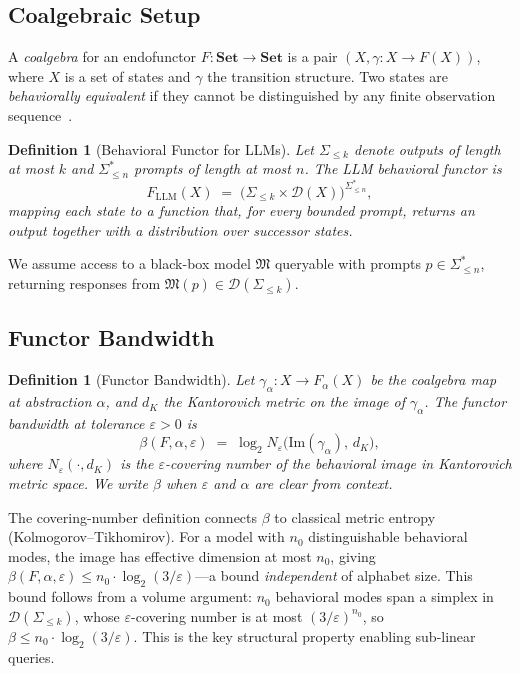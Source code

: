 \documentclass[11pt]{article}
\newtheorem{definition}[theorem]{Definition}
\newcommand{\DD}{\mathcal{D}}
\begin{document}
\subsection{Coalgebraic Setup}

A \emph{coalgebra} for an endofunctor $F: \mathbf{Set} \to
\mathbf{Set}$ is a pair $(X, \gamma: X \to F(X))$, where $X$ is a
set of states and $\gamma$ the transition structure.  Two states are
\emph{behaviorally equivalent} if they cannot be distinguished by any
finite observation sequence~\cite{rutten2000universal}.

\begin{definition}[Behavioral Functor for LLMs]\label{def:functor}
Let $\Sigma_{\le k}$ denote outputs of length at most $k$ and
$\Sigma^*_{\le n}$ prompts of length at most $n$.  The LLM
behavioral functor is
\[
  F_{\mathrm{LLM}}(X) \;=\;
    \bigl(\Sigma_{\le k} \times \DD(X)\bigr)^{\Sigma^*_{\le n}},
\]
mapping each state to a function that, for every bounded prompt,
returns an output together with a distribution over successor states.
\end{definition}

We assume access to a black-box model $\mathfrak{M}$ queryable with
prompts $p \in \Sigma^*_{\le n}$, returning responses from
$\mathfrak{M}(p) \in \DD(\Sigma_{\le k})$.

\subsection{Functor Bandwidth}

\begin{definition}[Functor Bandwidth]\label{def:bandwidth}
Let $\gamma_\alpha: X \to F_\alpha(X)$ be the coalgebra map at
abstraction $\alpha$, and $d_K$ the Kantorovich metric on the image
of $\gamma_\alpha$.  The \emph{functor bandwidth} at tolerance
$\varepsilon > 0$ is
\[
  \beta(F, \alpha, \varepsilon) \;=\; \log_2 N_\varepsilon\!\bigl(
    \mathrm{Im}(\gamma_\alpha),\, d_K\bigr),
\]
where $N_\varepsilon(\cdot, d_K)$ is the $\varepsilon$-covering number
of the behavioral image in Kantorovich metric space.  We write $\beta$
when $\varepsilon$ and $\alpha$ are clear from context.
\end{definition}

The covering-number definition connects $\beta$ to classical metric
entropy (Kolmogorov--Tikhomirov).  For a model with $n_0$
distinguishable behavioral modes, the image has effective dimension
at most $n_0$, giving $\beta(F, \alpha, \varepsilon) \le n_0 \cdot \log_2(3/\varepsilon)$---a
bound \emph{independent} of alphabet size.  This bound follows from a
volume argument: $n_0$ behavioral modes span a simplex in
$\DD(\Sigma_{\le k})$, whose $\varepsilon$-covering number is at most
$(3/\varepsilon)^{n_0}$, so
$\beta \le n_0 \cdot \log_2(3/\varepsilon)$.
This is the key structural property enabling sub-linear queries.
\end{document}

